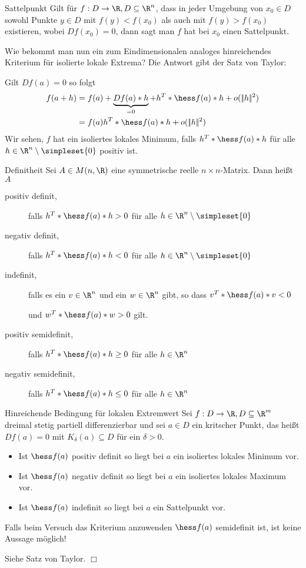 \begin{definition}{Sattelpunkt}
	Gilt für $f:D\rightarrow \R,D\subseteq \R^n$, dass in jeder Umgebung von $x_0\in D$ sowohl Punkte $y\in D$ mit $f(y)<f(x_0)$ als auch mit $f(y)>f(x_0)$ existieren, wobei $Df(x_0)=0$, dann sagt man $f$ hat bei $x_0$ einen Sattelpunkt.
\end{definition}

Wie bekommt man nun ein zum Eindimensionalen analoges hinreichendes Kriterium für isolierte lokale Extrema? Die Antwort gibt der Satz von Taylor:

Gilt $Df(a)=0$ so folgt
\begin{align*}
	f(a+h)&=f(a)+\underbrace{Df(a)*h}_{=0}+h^T*\hess f(a)*h+o(|\!|h|\!|^2)\\
	&=f(a)h^T*\hess f(a)*h+o(|\!|h|\!|^2)
\end{align*}
Wir sehen, $f$ hat ein isoliertes lokales Minimum, falls $h^T*\hess f(a)*h$ für alle $h\in\R^n\setminus\simpleset{0}$ positiv ist.

\begin{definition}{Definitheit}
	Sei $A\in M(n,\R)$ eine symmetrische reelle $n\times n$-Matrix. Dann heißt $A$
	\begin{description}
		\item [positiv definit,] falls $h^T*\hess f(a)*h>0$ für alle $h\in\R^n\setminus\simpleset{0}$
		\item [negativ definit,] falls $h^T*\hess f(a)*h<0$ für alle $h\in\R^n\setminus\simpleset{0}$
		\item [indefinit,] falls es ein $v\in\R^n$ und ein $w\in\R^n$ gibt, so dass $v^T*\hess f(a)*v<0$

		und $w^T*\hess f(a)*w>0$ gilt.

		\item [positiv semidefinit,] falls $h^T*\hess f(a)*h\geq0$ für alle $h\in\R^n$
		\item [negativ semidefinit,] falls $h^T*\hess f(a)*h\leq0$ für alle $h\in\R^n$
	\end{description}
\end{definition}

\begin{satz}{Hinreichende Bedingung für lokalen Extremwert}
	Sei $f:D\rightarrow \R,D\subseteq\R^m$ dreimal stetig partiell differenzierbar und sei $a\in D$ ein kritscher Punkt, das heißt $Df(a)=0$ mit $K_\delta (a)\subseteq D$ für ein $\delta>0$.
	\begin{itemize}
		\item Ist $\hess f(a)$ positiv definit so liegt bei $a$ ein isoliertes lokales Minimum vor.
		\item Ist $\hess f(a)$ negativ definit so liegt bei $a$ ein isoliertes lokales Maximum vor.
		\item Ist $\hess f(a)$ indefinit so liegt bei $a$ ein Sattelpunkt vor.
	\end{itemize}
	Falls beim Versuch das Kriterium anzuwenden $\hess f(a)$ semidefinit ist, ist keine Aussage möglich!
\end{satz}
\begin{beweis}
	Siehe Satz von Taylor. \hfill $\Box$
\end{beweis}

